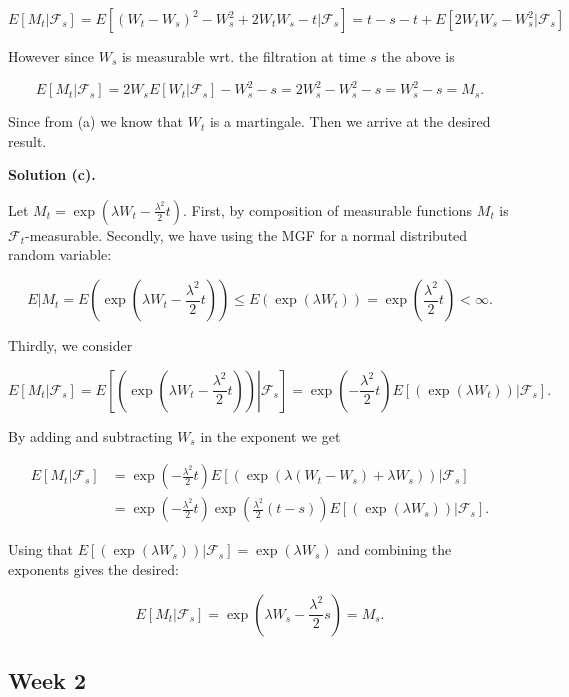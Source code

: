 \documentclass[
]{article}
\begin{document}
\[E[M_t\vert \mathcal{F}_s]=E[(W_t-W_s)^2-W_s^2+2W_tW_s-t\vert \mathcal{F}_s]=t-s-t+E[2W_tW_s-W_s^2\vert \mathcal{F}_s]\]

However since \(W_s\) is measurable wrt. the filtration at time \(s\)
the above is

\[E[M_t\vert \mathcal{F}_s]=2W_sE[W_t\vert \mathcal{F}_s]-W_s^2-s=2W_s^2-W_s^2-s=W_s^2-s=M_s.\]

Since from (a) we know that \(W_t\) is a martingale. Then we arrive at
the desired result.

\textbf{Solution (c).}

Let \(M_t=\exp\left(\lambda W_t-\frac{\lambda^2}{2}t\right)\). First, by
composition of measurable functions \(M_t\) is
\(\mathcal{F}_t\)-measurable. Secondly, we have using the MGF for a
normal distributed random variable:

\[E\vert M_t=E\left(\exp\left(\lambda W_t-\frac{\lambda^2}{2}t\right)\right)\le E\left(\exp\left(\lambda W_t\right)\right)=\exp\left(\frac{\lambda^2}{2}t\right)<\infty.\]

Thirdly, we consider

\[E[M_t\vert\mathcal{F}_s]=E\left.\left[\left(\exp\left(\lambda W_t-\frac{\lambda^2}{2}t\right)\right)\right\vert\mathcal{F}_s\right]=\exp\left(-\frac{\lambda^2}{2}t\right)E\left.\left[\left(\exp\left(\lambda W_t\right)\right)\right\vert\mathcal{F}_s\right].\]

By adding and subtracting \(W_s\) in the exponent we get

\begin{align*}
E[M_t\vert\mathcal{F}_s]&=\exp\left(-\frac{\lambda^2}{2}t\right)E\left.\left[\left(\exp\left(\lambda (W_t-W_s)+\lambda W_s\right)\right)\right\vert\mathcal{F}_s\right]\\
&=\exp\left(-\frac{\lambda^2}{2}t\right)\exp\left(\frac{\lambda^2}{2}(t-s)\right)E\left.\left[\left(\exp\left(\lambda W_s\right)\right)\right\vert\mathcal{F}_s\right].
\end{align*}

Using that
\(E\left.\left[\left(\exp\left(\lambda W_s\right)\right)\right\vert\mathcal{F}_s\right]=\exp\left(\lambda W_s\right)\)
and combining the exponents gives the desired:

\[E[M_t\vert\mathcal{F}_s]=\exp\left(\lambda W_s-\frac{\lambda^2}{2}s\right)=M_s.\]

\hypertarget{week-2}{%
\subsection{Week 2}\label{week-2}}
\end{document}
